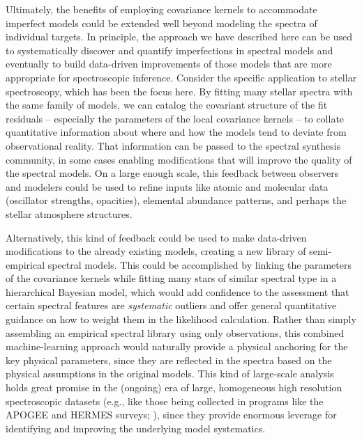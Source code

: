 \documentclass[iop,floatfix,numberedappendix,twocolappendix]{emulateapj}
\begin{document}
Ultimately, the benefits of employing covariance kernels to accommodate imperfect models could 
be extended well beyond modeling the spectra of individual targets.  In principle, the approach we 
have described here can be used to systematically discover and quantify imperfections in spectral 
models and eventually to build data-driven improvements of those models that are more appropriate 
for spectroscopic inference.  Consider the specific application to stellar spectroscopy, which has 
been the focus here.  By fitting many stellar spectra with the same family of models, we can 
catalog the covariant structure of the fit residuals -- especially the parameters of the local 
covariance kernels -- to collate quantitative information about where and how the models tend to 
deviate from observational reality.  That information can be passed to the spectral synthesis 
community, in some cases enabling modifications that will improve the quality of the spectral 
models.  On a large enough scale, this feedback between observers and modelers could be used to 
refine inputs like atomic and molecular data (oscillator strengths, opacities), elemental abundance 
patterns, and perhaps the stellar atmosphere structures.

Alternatively, this kind of feedback could be used to make data-driven modifications to the already
existing models, creating a new library of semi-empirical spectral models.  This could be
accomplished by linking the parameters of the covariance kernels while fitting many 
stars of similar spectral type in a hierarchical Bayesian model, which would add confidence to
the assessment that certain spectral features are {\it systematic} outliers and offer general
quantitative guidance on how to weight them in the likelihood calculation.  Rather than simply
assembling an empirical spectral library using only observations, this combined machine-learning
approach would naturally provide a physical anchoring for the key physical parameters, since they
are reflected in the spectra based on the physical assumptions in the original models.  This kind of
large-scale analysis holds great promise in the (ongoing) era of large, homogeneous high resolution
spectroscopic datasets (e.g., like those being collected in programs like the APOGEE and HERMES
surveys; \citealt{nidever12, zucker12}), since they provide enormous leverage for identifying and
improving the underlying model systematics. \\
\end{document}
